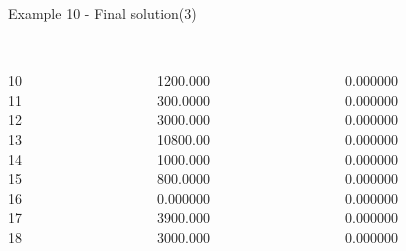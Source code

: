 \begin{frame}{Example 10 - Final solution(3)}
\footnotesize

\begin{columns}[t]
\begin{column}{0.3\textwidth}
\\
10\\
11\\
12\\
13\\
14\\
15\\
16\\
17\\
18\\

\end{column}
\begin{column}{0.3\textwidth}
\\
1200.000\\
300.0000\\
3000.000\\
10800.00\\
1000.000\\
800.0000\\
0.000000\\
3900.000\\
3000.000\\

\end{column}  

\begin{column}{0.3\textwidth}
\\
0.000000\\
0.000000\\
0.000000\\
0.000000\\
0.000000\\
0.000000\\
0.000000\\
0.000000\\
0.000000\\

\end{column}
\end{columns}  
\end{frame}

